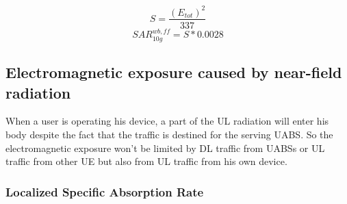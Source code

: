 \begin{equation}
S  = \frac{(E_{tot})^2}{337}
\label{eq:flux}
\end{equation}
\begin{equation}
SAR^{wb,ff}_{10g} = S * 0.0028
\label{eq:convertion}
\end{equation}

\subsection{Electromagnetic exposure caused by near-field radiation}
\label{sub:Uplinkexposure}
When a user is operating his device, a part of the \gls{UL} radiation will enter his body despite the fact that the 
 traffic is destined for the serving \gls{UABS}. So the 
 electromagnetic exposure won't be limited by \gls{DL} traffic from \gls{UABS}s or \gls{UL} traffic 
from other \gls{UE} but also from \gls{UL} traffic from his own device.

\subsubsection{Localized Specific Absorption Rate}

